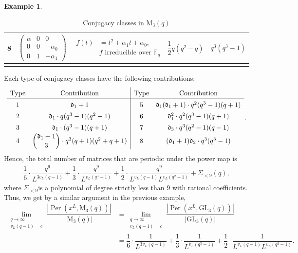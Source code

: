 \documentclass[11pt,twoside]{amsart}
\newcommand{\GL}{\mathrm{GL}}
\newcommand{\M}{\mathrm{M}}
\newcommand{\F}{\mathbb{F}}
\newcommand{\per}{\operatorname{Per}}
\renewcommand{\d}{\mathfrak d}
\theoremstyle{definition} %
\newtheorem{example}[lemma]{Example}
\begin{document}
\begin{example}
\begin{center}
\begin{center}
\begin{longtable}{ccccc}
8
&
$\begin{pmatrix}
\alpha&0&0\\
0&0&-\alpha_0\\
0&1&-\alpha_1
\end{pmatrix}$
&
$\begin{aligned}
f(t)&=t^2+\alpha_1t+\alpha_0,\\
& f \text{ irreducible over }\F_q
\end{aligned}$
&
$\dfrac{1}{2}q(q^2-q)$
&
$q^3(q^3-1)$
\\\hline
\caption{Conjugacy classes in $\M_3(q)$}
\label{tab:M3}
\end{longtable}
\end{center}
\end{center}
Each type of conjugacy classes have the following contributions;
\begin{align*}
\renewcommand{\arraystretch}{1.4}
\begin{array}{cc|cc}
    \text{Type} & \text{Contribution} & \text{Type} & \text{Contribution}  \\
    \hline
    1 & \d_1+1 & 5 & \d_1(\d_1+1)\cdot q^2(q^3-1)(q+1)\\
    2 & \d_1\cdot q(q^3-1)(q^2-1) & 6 & \d_1^2\cdot q^2(q^3-1)(q+1)\\
    3 & \d_1\cdot(q^3-1)(q+1) & 7 & \d_3 \cdot q^3 (q^2-1)(q-1)\\
    4 & \dbinom{\d_1+1}{3}\cdot q^3(q+1)(q^2+q+1)& 8 & (\d_1+1)\d_2\cdot q^3(q^3-1)
\end{array}.    
\end{align*}
Hence, the total number of matrices that are periodic under the power map is 
\begin{align*}
    \dfrac{1}{6}\cdot \dfrac{q^9}{L^{3v_L(q-1)}}+\dfrac{1}{3}\cdot\dfrac{q^9}{L^{v_L(q^3-1)}}+\dfrac{1}{2}\cdot\dfrac{q^9}{L^{v_L(q-1)}L^{v_L(q^2-1)}} +\Sigma_{<9}(q),
\end{align*}
where $\Sigma_{<9}$is a polynomial of degree strictly less than $9$ with rational coefficients. 
Thus, we get by a similar argument in the previous example, 
\begin{align*}
          \lim\limits_{\substack{q\longrightarrow \infty\\v_L(q-1)=c}}\dfrac{\left|\per(x^L,\M_3(q))\right|}{|\M_3(q)|}
    &=    \lim\limits_{\substack{q\longrightarrow \infty\\
    v_L(q-1)=c}}\dfrac{\left|\per(x^L,\GL_3(q))\right|}{|\GL_3(q)|}\\
    &=\dfrac{1}{6}\cdot \dfrac{1}{L^{3v_L(q-1)}}+\dfrac{1}{3}\cdot\dfrac{1}{L^{v_L(q^3-1)}}+\dfrac{1}{2}\cdot\dfrac{1}{L^{v_L(q-1)}L^{v_L(q^2-1)}}.
\end{align*}
\end{example}
\end{document}
